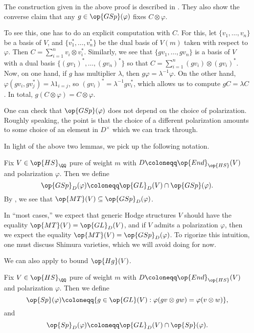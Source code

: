 \documentclass[../thesis.tex]{subfiles}
\begin{document}
\begin{remark}
	The construction given in the above proof is described in \cite[Remark~8.3.4]{ggl-fermat}. They also show the converse claim that any $g\in\op{GSp}(\varphi)$ fixes $C\otimes\varphi$.
	
	To see this, one has to do an explicit computation with $C$. For this, let $\{v_1,\ldots,v_n\}$ be a basis of $V$, and $\{v_1^*,\ldots,v_n^*\}$ be the dual basis of $V(m)$ taken with respect to $\varphi$. Then $C=\sum_{i=1}^nv_i\otimes v_i^*$. Similarly, we see that $\{gv_1,\ldots,gv_n\}$ is a basis of $V$ with a dual basis $\{(gv_1)^*,\ldots,(gv_n)^*\}$ so that $C=\sum_{i=1}^n(gv_i)\otimes(gv_i)^*$. Now, on one hand, if $g$ has multiplier $\lambda$, then $g\varphi=\lambda^{-1}\varphi$. On the other hand, $\varphi(gv_i,gv_j^*)=\lambda1_{i=j}$, so $(gv_i)^*=\lambda^{-1}gv_i^*$, which allows us to compute $gC=\lambda C$. In total, $g(C\otimes\varphi)=C\otimes\varphi$.
\end{remark}
\begin{remark}
	One can check that $\op{GSp}(\varphi)$ does not depend on the choice of polarization. Roughly speaking, the point is that the choice of a different polarization amounts to some choice of an element in $D^\times$ which we can track through.%
\end{remark}
In light of the above two lemmas, we pick up the following notation.
\begin{notation}
	Fix $V\in\op{HS}_\QQ$ pure of weight $m$ with $D\coloneqq\op{End}_{\op{HS}}(V)$ and polarization $\varphi$. Then we define
	\[\op{GSp}_D(\varphi)\coloneqq\op{GL}_D(V)\cap\op{GSp}(\varphi).\]
	By , we see that $\op{MT}(V)\subseteq\op{GSp}_D(\varphi)$.
\end{notation}
\begin{remark} \label{rem:generic-mt}
	In ``most cases,'' we expect that generic Hodge structures $V$ should have the equality $\op{MT}(V)=\op{GL}_D(V)$, and if $V$ admits a polarization $\varphi$, then we expect the equality $\op{MT}(V)=\op{GSp}_D(\varphi)$. To rigorize this intuition, one must discuss Shimura varieties, which we will avoid doing for now.
\end{remark}
We can also apply  to bound $\op{Hg}(V)$.
\begin{notation}
	Fix $V\in\op{HS}_\QQ$ pure of weight $m$ with $D\coloneqq\op{End}_{\op{HS}}(V)$ and polarization $\varphi$. Then we define
	\[\op{Sp}(\varphi)\coloneqq\{g\in\op{GL}(V):\varphi(gv\otimes gw)=\varphi(v\otimes w)\},\]
	and
	\[\op{Sp}_D(\varphi)\coloneqq\op{GL}_D(V)\cap\op{Sp}(\varphi).\]
\end{notation}
\end{document}
